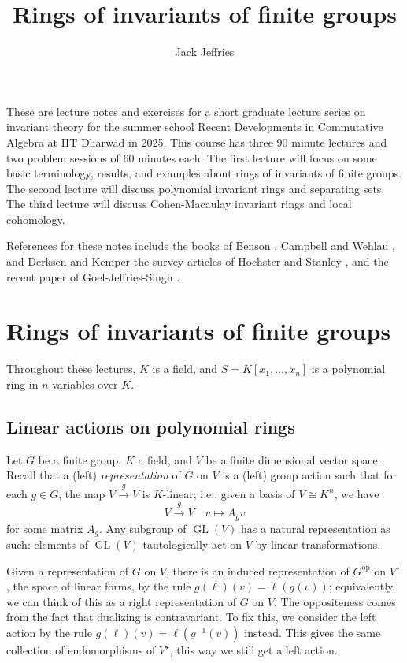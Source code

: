 \documentclass[12pt]{amsart}
\theoremstyle{definition}
\numberwithin{equation}{theorem}
\def\GL{\operatorname{GL}}
\def\to{\longrightarrow}
\def\mapsto{\longmapsto}
\begin{document}
\title[Rings of invariants]{Rings of invariants of finite groups}

\author{Jack Jeffries}
\address{Department of Mathematics, University of Nebraska, 203 Avery Hall, Lincoln, NE-68588, USA}
\maketitle

These are lecture notes and exercises for a short graduate lecture series on invariant theory for the summer school Recent Developments in Commutative Algebra at IIT Dharwad in 2025. This course has three 90 minute lectures and two problem sessions of 60 minutes each. The first lecture will focus on some basic terminology, results, and examples about rings of invariants of finite groups. The second lecture will discuss polynomial invariant rings and separating sets. The third lecture will discuss Cohen-Macaulay invariant rings and local cohomology.

References for these notes include the books of Benson \cite{B}, Campbell and Wehlau \cite{CW}, and Derksen and Kemper \cite{DK} the survey articles of Hochster \cite{H} and Stanley \cite{S}, and the recent paper of Goel-Jeffries-Singh \cite{GJS}.


\section{Rings of invariants of finite groups} Throughout these lectures, $K$ is a field, and $S=K[x_1,\dots,x_n]$ is a polynomial ring in $n$ variables over $K$. 

\subsection*{Linear actions on polynomial rings}
Let $G$ be a finite group, $K$ a field, and $V$ be a finite dimensional vector space. Recall that a (left) \emph{representation} of $G$ on $V$ is a (left) group action such that for each $g\in G$, the map $V \stackrel{g}{\to} V$
is $K$-linear; i.e., given a basis of $V\cong K^n$, we have
\[ V \stackrel{g}{\to} V \quad v \mapsto A_g v\]
for some matrix $A_g$. Any subgroup of $\GL(V)$ has a natural representation as such: elements of $\GL(V)$ tautologically act on $V$ by linear transformations.

Given a representation of $G$ on $V$, there is an induced representation of $G^\mathrm{op}$ on $V^\star$, the space of linear forms, by the rule $g(\ell)(v)=\ell(g(v))$; equivalently, we can think of this as a right representation of $G$ on $V$. The oppositeness comes from the fact that dualizing is contravariant. To fix this, we consider the left action by the rule $g(\ell)(v)=\ell(g^{-1}(v))$ instead. This gives the same collection of endomorphisms of $V^\star$, this way we still get a left action.
\end{document}

